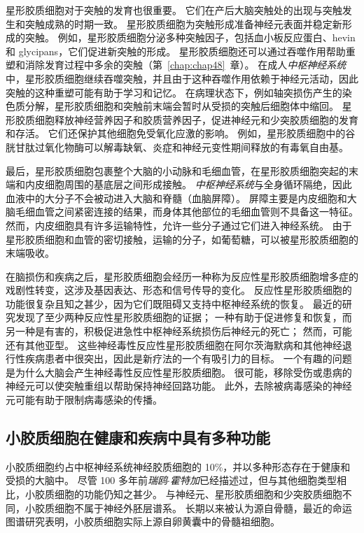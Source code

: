 星形胶质细胞对于突触的发育也很重要。
它们在产后大脑突触处的出现与突触发生和突触成熟的时期一致。
星形胶质细胞为突触形成准备神经元表面并稳定新形成的突触。
例如，星形胶质细胞分泌多种突触因子，包括血小板反应蛋白、hevin 和 glycipans，它们促进新突触的形成。
星形胶质细胞还可以通过吞噬作用帮助重塑和消除发育过程中多余的突触（第~\ref{chap:chap48}~章）。
在成人\textit{中枢神经系统}中，星形胶质细胞继续吞噬突触，并且由于这种吞噬作用依赖于神经元活动，因此突触的这种重塑可能有助于学习和记忆。
在病理状态下，例如轴突损伤产生的染色质分解，星形胶质细胞和突触前末端会暂时从受损的突触后细胞体中缩回。
星形胶质细胞释放神经营养因子和胶质营养因子，促进神经元和少突胶质细胞的发育和存活。
它们还保护其他细胞免受氧化应激的影响。
例如，星形胶质细胞中的谷胱甘肽过氧化物酶可以解毒缺氧、炎症和神经元变性期间释放的有毒氧自由基。


最后，星形胶质细胞包裹整个大脑的小动脉和毛细血管，在星形胶质细胞突起的末端和内皮细胞周围的基底层之间形成接触。
\textit{中枢神经系统}与全身循环隔绝，因此血液中的大分子不会被动进入大脑和脊髓（血脑屏障）。
屏障主要是内皮细胞和大脑毛细血管之间紧密连接的结果，而身体其他部位的毛细血管则不具备这一特征。
然而，内皮细胞具有许多运输特性，允许一些分子通过它们进入神经系统。
由于星形胶质细胞和血管的密切接触，运输的分子，如葡萄糖，可以被星形胶质细胞的末端吸收。


在脑损伤和疾病之后，星形胶质细胞会经历一种称为反应性星形胶质细胞增多症的戏剧性转变，这涉及基因表达、形态和信号传导的变化。
反应性星形胶质细胞的功能很复杂且知之甚少，因为它们既阻碍又支持中枢神经系统的恢复。
最近的研究发现了至少两种反应性星形胶质细胞的证据；
一种有助于促进修复和恢复，而另一种是有害的，积极促进急性中枢神经系统损伤后神经元的死亡；
然而，可能还有其他亚型。
这些神经毒性反应性星形胶质细胞在阿尔茨海默病和其他神经退行性疾病患者中很突出，因此是新疗法的一个有吸引力的目标。
一个有趣的问题是为什么大脑会产生神经毒性反应性星形胶质细胞。
很可能，移除受伤或患病的神经元可以使突触重组以帮助保持神经回路功能。
此外，去除被病毒感染的神经元可能有助于限制病毒感染的传播。


\subsection{小胶质细胞在健康和疾病中具有多种功能}

小胶质细胞约占中枢神经系统神经胶质细胞的 10\%，并以多种形态存在于健康和受损的大脑中。
尽管 100 多年前\textit{瑞鸥$\cdot$霍特加}已经描述过，但与其他细胞类型相比，小胶质细胞的功能仍知之甚少。
与神经元、星形胶质细胞和少突胶质细胞不同，小胶质细胞不属于神经外胚层谱系。
长期以来被认为源自骨髓，最近的命运图谱研究表明，小胶质细胞实际上源自卵黄囊中的骨髓祖细胞。


